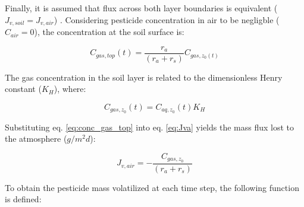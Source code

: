 \documentclass[]{article}
\begin{document}
Finally, it is assumed that flux across both layer boundaries is
equivalent (\(J_{v,soil} = J_{v,air}\)) \citep{Leistra2001}. Considering
pesticide concentration in air to be negligble (\(C_{air} = 0\)), the
concentration at the soil surface is:

\begin{equation}
C_{gas,top}(t) = \frac{r_a}{(r_a + r_s)} C_{gas,z_{0}(t)}
\label{eq:conc_gas_top}
\end{equation}

The gas concentration in the soil layer is related to the dimensionless
Henry constant (\(K_H\)), where:

\begin{equation}
C_{gas,z_0}(t) = C_{aq,z_0}(t) K_H  
\label{eq:henry}
\end{equation}

Substituting eq. \ref{eq:conc_gas_top} into eq. \ref{eq:Jva} yields the
mass flux lost to the atmosphere (\(g/m^2d\)):

\begin{equation}
J_{v,air} = - \frac{C_{gas,z_0}}{(r_a + r_s)}
\label{eq:Jva_final}
\end{equation}

To obtain the pesticide mass volatilized at each time step, the
following function is defined:
\end{document}
